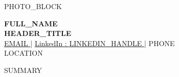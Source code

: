 \documentclass[9.5pt,a4paper]{article}
\begin{document}

\noindent
{{PHOTO_BLOCK}}
\begin{minipage}[t]{0.74\textwidth}
\vspace{0pt}

{\color{accent}\sffamily\Huge \textbf{ {{FULL_NAME}} }}\\[-1pt]
{\color{accent}\sffamily\Large \textbf{ {{HEADER_TITLE}} }}\\[6pt]

\centering
\sffamily\small
\href{mailto:{{EMAIL}}}{ {{EMAIL}} }
\quad|\quad
\href{ {{LINKEDIN_URL}} }{LinkedIn : {{LINKEDIN_HANDLE}} }
\quad|\quad
{{PHONE}}\\
{{LOCATION}}

\vspace{0.1cm}
\raggedright
{{SUMMARY}}

\end{minipage}

\vspace{0.15cm}
\end{document}
